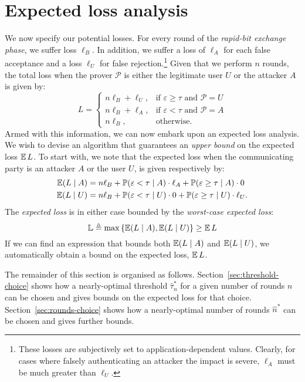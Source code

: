 \documentclass[a4paper]{article}
\newcommand \defn {\mathrel{\triangleq}}
\renewcommand\Pr{\mathop{\mbox{\ensuremath{\mathbb{P}}}}\nolimits}
\newcommand\E{\mathop{\mbox{\ensuremath{\mathbb{E}}}}\nolimits}
\newcommand \thr {\tau}
\newcommand \hthr {\hat{\thr}_n^*}
\newcommand \hns {\hat{n}^*}
\newcommand \err {\varepsilon}
\newcommand \loss {L}
\newcommand \worst {\mathbb{L}}
\newcommand \LA {\ell_A}
\newcommand \LU {\ell_U}
\newcommand \LB {\ell_B}
\newcommand \auth {\mathcal{P}}
\theoremstyle{plain} \newtheorem{remark}{Remark}
\theoremstyle{plain} \newtheorem{definition}{Definition}
\theoremstyle{plain} \newtheorem{example}{Example}
\theoremstyle{plain} \newtheorem{assumption}{Assumption}
\theoremstyle{plain} \newtheorem{conjecture}{Conjecture}
\theoremstyle{plain} \newtheorem{theorem}{Theorem}
\theoremstyle{plain} \newtheorem{proposition}{Proposition}
\theoremstyle{plain} \newtheorem{lemma}{Lemma}
\theoremstyle{plain} \newtheorem{corollary}{Corollary}
\begin{document}
\section{Expected loss analysis}
\label{sec:loss-analysis}
We now specify our potential losses. For every round of the
\textit{rapid-bit exchange phase}, we suffer loss $\LB$. In addition,
we suffer a loss of $\LA$ for each false acceptance and a loss $\LU$
for false rejection.\footnote{These losses are subjectively set to
  application-dependent values. Clearly, for cases where falsely
  authenticating an attacker the impact is severe, $\LA$ must be much
  greater than $\LU$.} Given that we perform $n$ rounds, the total
loss when the prover $\auth$ is either the legitimate user $U$ or the
attacker $A$ is given by:
\begin{equation}
  \loss =
  \begin{cases}
    n\LB + \LU, & \textrm{if $\err \geq \thr$ and $\auth = U$}\\
    n\LB + \LA, & \textrm{if $\err < \thr$ and $\auth = A$}\\
    n\LB,  & \textrm{otherwise}.
  \end{cases}
  \label{eq:loss}
\end{equation}
Armed with this information, we can now embark upon an
expected loss analysis.  We wish to devise an algorithm that
guarantees an {\em upper bound} on the expected loss $\E \loss$. To
start with, we note that the expected loss when the
communicating party is an attacker $A$ or the user $U$, is given
respectively by:
\begin{align}
  \E (\loss \mid A) &= n\LB + \Pr(\err < \thr \mid A) \cdot \LA +
  \Pr(\err \geq \thr \mid A) \cdot 0
  \label{eq:attacker-loss}
  \\
  \E (\loss \mid U) &= n\LB + \Pr(\err < \thr \mid U) \cdot 0 +
  \Pr(\err \geq \thr \mid U) \cdot \LU.
  \label{eq:user-loss}
\end{align}
The \textit{expected loss} is in either case bounded by the {\em worst-case expected loss}:
\begin{equation}
  \worst \defn \max \left\{ \E(\loss \mid A), \E(\loss \mid U)\right\}
\geq \E \loss 
  \label{eq:expected-loss}
\end{equation}
If we can find an expression that bounds both $\E(\loss \mid A)$ and
$\E(\loss \mid U)$, we automatically obtain a bound on the expected
loss, $\E \loss$.

The remainder of this section is organised as
follows. Section~\ref{sec:threshold-choice} shows how a nearly-optimal
threshold $\hthr$ for a given number of rounds $n$ can be chosen and
gives bounds on the expected loss for that choice.
Section~\ref{sec:rounds-choice} shows how a nearly-optimal number of
rounds $\hns$ can be chosen and gives further bounds.
\end{document}
